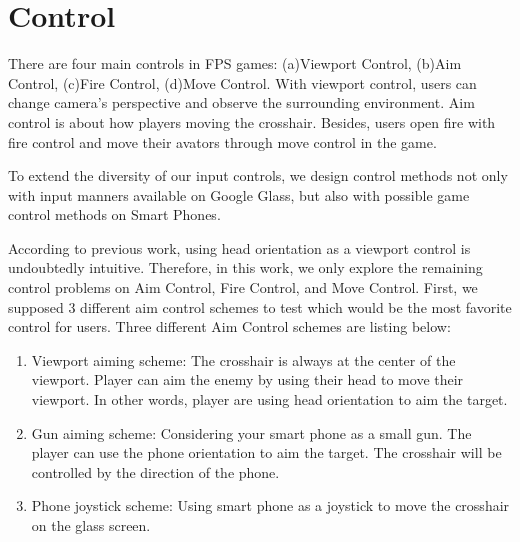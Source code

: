 \documentclass{acm_proc_article-sp}
\begin{document}
\section{Control}
There are four main controls in FPS games: (a)Viewport Control, (b)Aim Control, (c)Fire Control, (d)Move Control.
With viewport control, users can change camera's perspective and observe the surrounding environment.
Aim control is about how players moving the crosshair.
Besides, users open fire with fire control and move their avators through move control in the game.

To extend the diversity of our input controls, we design control methods not only with input manners available on Google Glass, but also with possible game control methods on Smart Phones.

According to previous work\cite{headvideo,tele,robot,viewport}, using head orientation as a viewport control is undoubtedly intuitive.%
Therefore, in this work, we only explore the remaining control problems on Aim Control, Fire Control, and Move Control. 
First, we supposed 3 different aim control schemes to test which would be the most favorite control for users. 
Three different Aim Control schemes are listing below:

\begin{enumerate}
\item Viewport aiming scheme: The crosshair is always at the center of the viewport. Player can aim the enemy by using their head to move their viewport. In other words, player are using head orientation to aim the target.

\item Gun aiming scheme: Considering your smart phone as a small gun. The player can use the phone orientation to aim the target. The crosshair will be controlled by the direction of the phone.

\item Phone joystick scheme: Using smart phone as a joystick to move the crosshair on the glass screen.
\end{enumerate}
\end{document}
